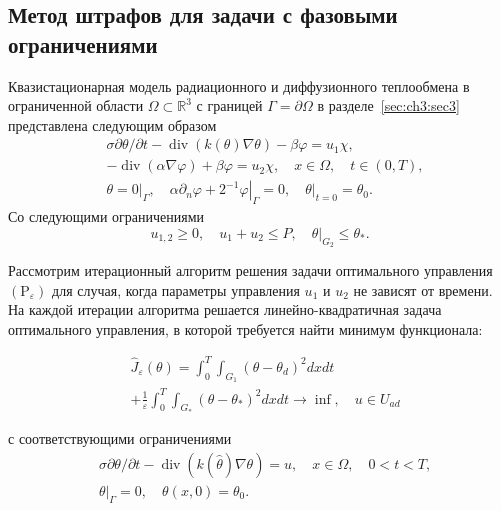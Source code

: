 
\subsection{Метод штрафов для задачи с фазовыми ограничениями}
\label{subsec:ch4/sec3/subsec5}
Квазистационарная модель радиационного и диффузионного теплообмена в ограниченной области
$\Omega \subset \mathbb{R}^{3}$ с границей $\Gamma=\partial \Omega$
в разделе~\ref{sec:ch3:sec3} представлена следующим образом
\begin{equation*}
\begin{aligned}
& \sigma \partial \theta / \partial t-\operatorname{div}(k(\theta) \nabla \theta)-\beta \varphi=u_{1} \chi, \\
& -\operatorname{div}(\alpha \nabla \varphi)+\beta \varphi=u_{2} \chi, \quad x \in \Omega, \quad t \in(0, T), \\
& \theta=\left.0\right|_{\Gamma}, \quad \alpha \partial_{n} \varphi+\left.2^{-1} \varphi\right|_{\Gamma}=0,\left.\quad \theta\right|_{t=0}=\theta_{0} .
\end{aligned}
\end{equation*}
Со следующими ограничениями
\[
    u_{1,2} \geq 0, \quad u_{1}+u_{2} \leq P,\left.\quad \theta\right|_{G_{2}} \leq \theta_{*}.
\]


Рассмотрим итерационный алгоритм решения задачи оптимального управления
$\left(\mathrm{P}_{\varepsilon}\right)$ для случая, когда параметры управления
$u_{1}$ и $u_{2}$ не зависят от времени.
На каждой итерации алгоритма
решается линейно-квадратичная задача оптимального управления,
в которой требуется найти минимум функционала:

\begin{equation}
    \label{eq:3_2:9}
    \begin{aligned}
        &\widehat{J}_{\varepsilon}(\theta)=\int_{0}^{T}
        \int_{G_{1}}\left(\theta-\theta_{d}\right)^{2} d x d t \\
        &+\frac{1}{\varepsilon} \int_{0}^{T}
        \int_{G_{*}}\left(\theta-\theta_{*}\right)^{2} d x d t
        \rightarrow \inf , \quad u \in U_{a d}
    \end{aligned}
\end{equation}

с соответствующими ограничениями
\begin{equation}
    \label{eq:3_2:10}
    \begin{aligned}
        &\sigma \partial \theta / \partial t-\operatorname{div}(k(\widehat{\theta})
        \nabla \theta)=u, \quad x \in \Omega, \quad 0<t<T, \\
        &\left.\theta\right|_{\Gamma}=0, \quad \theta(x, 0)=\theta_{0}.
    \end{aligned}
\end{equation}

